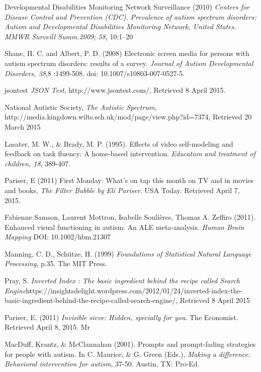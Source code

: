 \documentclass[a4paper, 11pt]{article}
\begin{document}
\begin{thebibliography}{100}
Developmental Disabilities Monitoring Network Surveillance (2010) \textit{Centers for Disease Control and Prevention (CDC). Prevalence of autism spectrum disorders: Autism and Developmental Disabilities Monitoring Network, United States. MMWR Surveill Summ.2009; 58}, 10:1–20


Shane, H. C. and Albert, P. D. (2008) Electronic screen media for persons with autism spectrum disorders: results of a survey. \textit{Journal of Autism Developmental Disorders, 38},8 :1499-508. doi: 10.1007/s10803-007-0527-5.


jsontest \textit{JSON Test}, http://www.jsontest.com/, Retrieved 8 April 2015.

National Autistic Society, \textit{The Autistic Spectrum}, \\http://media.kingdown.wilts.sch.uk/mod/page/view.php?id=7374, Retrieved 20 March 2015

Lasater, M. W., \& Brady, M. P. (1995). Effects of video self-modeling and feedback on task fluency: A home-based intervention. \textit{Education and treatment of children, 18}, 389-407.

 Pariser, E (2011) First Monday: What's on tap this month on TV and in movies and books, \textit{The Filter Bubble by Eli Pariser}. USA Today. Retrieved April 7, 2015. 

Fabienne Samson, Laurent Mottron, Isabelle Soulières, Thomas A. Zeffiro (2011). Enhanced visual functioning in autism: An ALE meta-analysis. \textit{Human Brain Mapping} DOI: 10.1002/hbm.21307

Manning, C. D., Schütze, H. (1999) \textit{Foundations of Statistical Natural Language Processing}, p.35. The MIT Press.

 Pray, S. \textit{Inverted Index : The basic ingredient behind the recipe called Search Engine}https://insightsdelight.wordpress.com/2012/01/24/inverted-index-the-basic-ingredient-behind-the-recipe-called-search-engine/, Retrieved 8 April 2015

 Pariser, E. (2011) \textit{Invisible sieve: Hidden, specially for you}. The Economist. Retrieved April 8, 2015. Mr 

 MacDuff, Krantz, \& McClannahan (2001). Prompts and prompt-fading strategies for people with autism. In C. Maurice, \& G. Green (Eds.), \textit{Making a difference: Behavioral intervention for autism}, 37-50. Austin, TX: Pro-Ed.


\end{thebibliography}
\end{document}
